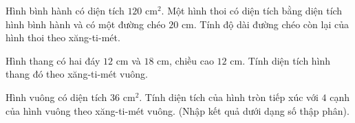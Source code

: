 \begin{ex} %
Hình bình hành có diện tích $120\text{ cm}^2$. Một hình thoi có diện tích bằng diện tích hình bình hành và có một đường chéo $20\text{ cm}$. Tính độ dài đường chéo còn lại của hình thoi theo xăng-ti-mét.
\end{ex}

\begin{ex} %
Hình thang có hai đáy $12\text{ cm}$ và $18\text{ cm}$, chiều cao $12\text{ cm}$. Tính diện tích hình thang đó theo xăng-ti-mét vuông.
\end{ex}

\begin{ex} %
Hình vuông có diện tích $36\text{ cm}^2$. Tính diện tích của hình tròn tiếp xúc với $4$ cạnh của hình vuông theo xăng-ti-mét vuông. (Nhập kết quả dưới dạng số thập phân).
\end{ex}
